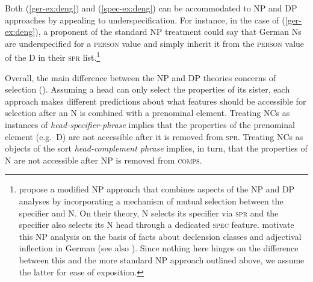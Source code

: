 \documentclass[output=paper,colorlinks,citecolor=brown]{langscibook}
\begin{document}
Both (\ref{ger-ex:deng}) and (\ref{spec-ex:deng}) can be  accommodated to NP and DP approaches by appealing to underspecification. For instance, in the case of (\ref{ger-ex:deng}), a proponent of the standard NP treatment could say that German Ns are underspecified for a \textsc{person} value and simply inherit it from the \textsc{person} value of the D in their \textsc{spr} list.\footnote{\citet[47--51]{Pollard&Sag94a} propose a modified NP approach that combines aspects of the NP and DP analyses by incorporating a mechanism of mutual selection between the specifier and N. On their theory,  N selects its specifier via \textsc{spr} and the specifier also selects its N head through a dedicated \textsc{spec} feature. \citet[371--373]{Pollard&Sag94a} motivate this NP analysis on the basis of facts about declension classes and adjectival inflection in German (see also \citealt{MyP&Mueller21a}).  %
%
Since nothing here hinges on the difference between this and the more standard NP approach outlined above, we assume the latter for ease of exposition.
%
%	

}

Overall, the main difference between the NP and DP theories concerns  of selection (\citealt{Sag2010a}).  Assuming a head can only select the properties of its sister,  each approach makes different predictions about what features should be accessible for selection after an N is combined with a prenominal element. Treating NCs as instances of \textit{head-specifier-phrase} implies that the properties of the prenominal element (e.g.\ D) are not accessible after it is removed from \textsc{spr}. Treating NCs as objects of the sort \textit{head-complement phrase} implies, in turn, that the properties of N are not accessible after NP is removed from \textsc{comps}. 
\end{document}
